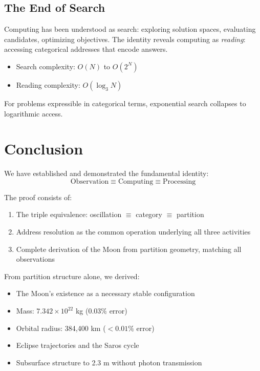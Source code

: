 \documentclass[twocolumn,10pt]{article}
\theoremstyle{definition}
\theoremstyle{remark}
\begin{document}
\subsection{The End of Search}

Computing has been understood as search: exploring solution spaces, evaluating candidates, optimizing objectives. The identity reveals computing as \emph{reading}: accessing categorical addresses that encode answers.

\begin{itemize}
    \item Search complexity: $O(N)$ to $O(2^N)$
    \item Reading complexity: $O(\log_3 N)$
\end{itemize}

For problems expressible in categorical terms, exponential search collapses to logarithmic access.

\section{Conclusion}
\label{sec:conclusion}

We have established and demonstrated the fundamental identity:
\begin{equation}
\boxed{\text{Observation} \equiv \text{Computing} \equiv \text{Processing}}
\end{equation}

The proof consists of:
\begin{enumerate}
    \item The triple equivalence: oscillation $\equiv$ category $\equiv$ partition
    \item Address resolution as the common operation underlying all three activities
    \item Complete derivation of the Moon from partition geometry, matching all observations
\end{enumerate}

From partition structure alone, we derived:
\begin{itemize}
    \item The Moon's existence as a necessary stable configuration
    \item Mass: $7.342 \times 10^{22}$ kg (0.03\% error)
    \item Orbital radius: 384,400 km ($<0.01\%$ error)
    \item Eclipse trajectories and the Saros cycle
    \item Subsurface structure to 2.3 m without photon transmission
\end{itemize}
\end{document}
